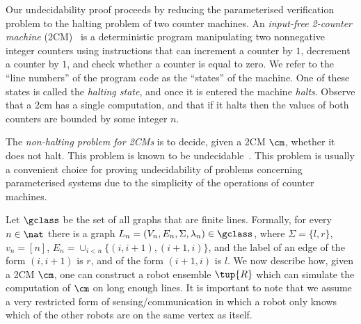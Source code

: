 


Our undecidability proof proceeds by reducing the parameterised verification problem to the halting problem of two counter machines. An \emph{input-free 2-counter machine} (2CM)~\cite{Minsky67} is a deterministic program manipulating two nonnegative integer counters using instructions that can increment a counter by $1$, decrement a counter by $1$, and check whether a counter is equal to zero. We refer to the ``line numbers'' of the program code as the ``states'' of the machine. One of these states is called the \emph{halting state}, and once it is entered the machine \emph{halts}. Observe that a 2cm has a single computation, and that if it halts then the values of both counters are bounded by some integer $n$.

The \emph{non-halting problem for 2CMs} is to decide, given a 2CM $\cm$, whether it does not halt. This problem is known to be undecidable~\cite{Minsky67}. This problem is usually a convenient choice for proving undecidability of problems concerning parameterised systems due to the simplicity of the operations of counter machines.

Let $\gclass$ be the set of all graphs that are finite lines. Formally, for every $n \in \nat$ there is a graph $L_n = (V_n,E_n,\Sigma,\lambda_n) \in \gclass$, where $\Sigma = \{l,r\}$, $v_n = [n]$, $E_n = \cup_{i < n} \{(i,i+1), (i+1,i)\}$, and the label of an edge of the form $(i,i+1)$ is $r$, and of the form $(i+1,i)$ is $l$. We now describe how, given a 2CM $\cm$, one can construct a robot ensemble $\tup{R}$ which can simulate the computation of $\cm$ on long enough lines. It is important to note that we assume a very restricted form of sensing/communication in which a robot only knows which of the other robots are on the same vertex as itself.

